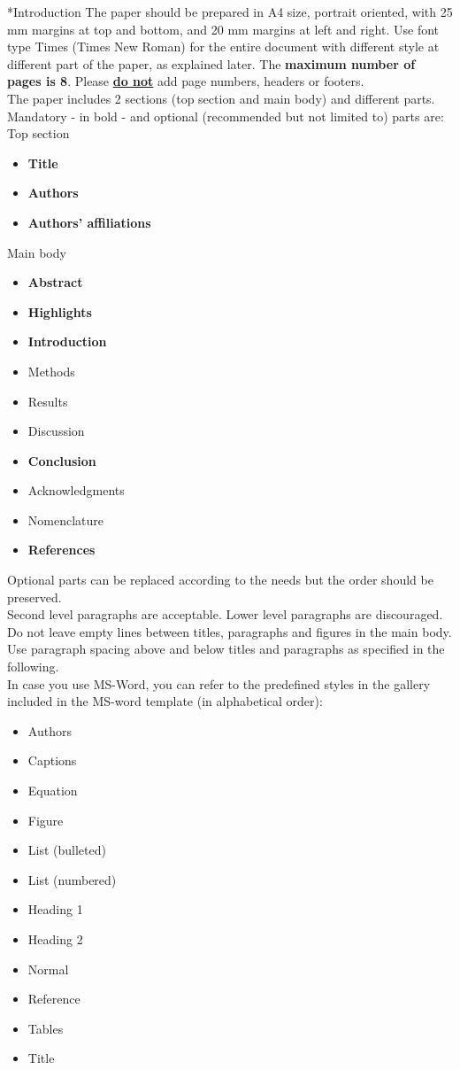 \documentclass[twocolumn, a4paper,10pt]{article}
\makeatletter
\renewcommand\section{\@startsection{section}{1}{\z@}{3pt}{3pt}{\normalfont\large\bfseries}}
\makeatother
\begin{document}
\section*{Introduction}
The paper should be prepared in A4 size, portrait oriented, with 25 mm margins at top and bottom, and 20 mm margins at left and right. Use font type Times (Times New Roman) for the entire document with different style at different part of the paper, as explained later. The \textbf{maximum number of pages is 8}. Please \textbf{\underline{do not}} add page numbers, headers or footers.\\
The paper includes 2 sections (top section and main body) and different parts. Mandatory - in bold - and optional (recommended but not limited to) parts are:\\
Top section
\begin{itemize}
\item \textbf{Title}
\item \textbf{Authors}
\item \textbf{Authors' affiliations}
\end{itemize}
Main body
\begin{itemize}
\item \textbf{Abstract}
\item \textbf{Highlights}
\item \textbf{Introduction}
\item Methods
\item Results
\item Discussion
\item \textbf{Conclusion}
\item Acknowledgments
\item Nomenclature
\item \textbf{References}
\end{itemize}
Optional parts can be replaced according to the needs but the order should be preserved.\\
Second level paragraphs are acceptable. Lower level paragraphs are discouraged.\\
Do not leave empty lines between titles, paragraphs and figures in the main body. Use paragraph spacing above and below titles and paragraphs as specified in the following. \\
In case you use MS-Word, you can refer to the predefined styles in the gallery included in the MS-word template (in alphabetical order):
\begin{itemize}
\item Authors
\item Captions
\item Equation
\item Figure
\item List (bulleted)
\item List (numbered)
\item Heading 1
\item Heading 2
\item Normal
\item Reference
\item Tables
\item Title
\end{itemize}
\end{document}
